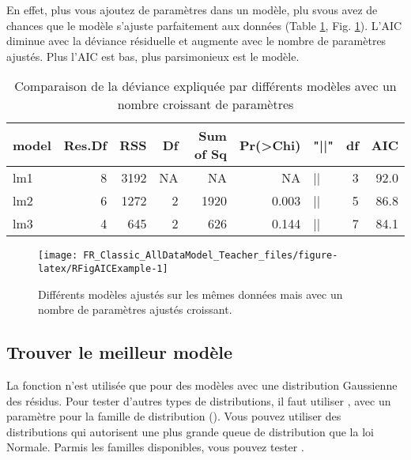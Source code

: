 \documentclass[french,a4paper]{article}
\begin{document}
En effet, plus vous ajoutez de paramètres dans un modèle, plu svous avez de chances que le modèle s'ajuste parfaitement aux données (Table \ref{tab:RTableAnovaEx}, Fig. \ref{fig:RFigAICExample}). L'AIC diminue avec la déviance résiduelle et augmente avec le nombre de paramètres ajustés. Plus l'AIC est bas, plus parsimonieux est le modèle.



\begin{table}[t]

\caption{\label{tab:RTableAnovaEx}Comparaison de la déviance expliquée par différents modèles avec un nombre croissant de paramètres}
\centering
\begin{tabular}{l|r|r|r|r|r|l|r|r}
\hline
model & Res.Df & RSS & Df & Sum of Sq & Pr(>Chi) & "||" & df & AIC\\
\hline
lm1 & 8 & 3192 & NA & NA & NA & || & 3 & 92.0\\
\hline
lm2 & 6 & 1272 & 2 & 1920 & 0.003 & || & 5 & 86.8\\
\hline
lm3 & 4 & 645 & 2 & 626 & 0.144 & || & 7 & 84.1\\
\hline
\end{tabular}
\end{table}

\begin{figure}[!h]

{\centering \texttt{[image: FR\_Classic\_AllDataModel\_Teacher\_files/figure-latex/RFigAICExample-1]} 

}

\caption{Différents modèles ajustés sur les mêmes données mais avec un nombre de paramètres ajustés croissant.}\label{fig:RFigAICExample}
\end{figure}

\hypertarget{trouver-le-meilleur-modele}{%
\subsection{Trouver le meilleur modèle}\label{trouver-le-meilleur-modele}}

La fonction  n'est utilisée que pour des modèles avec une distribution Gaussienne des résidus. Pour tester d'autres types de distributions, il faut utiliser , avec un paramètre pour la famille de distribution (). Vous pouvez utiliser des distributions qui autorisent une plus grande queue de distribution que la loi Normale. Parmis les familles disponibles, vous pouvez tester .
\end{document}
